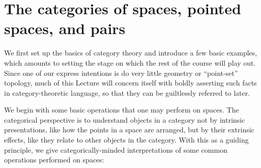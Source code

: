 \section{The categories of spaces, pointed spaces, and pairs}\label{CategoriesSection}

We first set up the basics of category theory and introduce a few basic examples, which amounts to setting the stage on which the rest of the course will play out.
Since one of our express intentions is do very little geometry or ``point-set'' topology, much of this Lecture will concern itself with boldly asserting such facts in category-theoretic language, so that they can be guiltlessly referred to later.

We begin with some basic operations that one may perform on spaces.
The categorical perspective is to understand objects in a category not by intrinsic presentations, like how the points in a space are arranged, but by their extrinsic effects, like they relate to other objects in the category.
With this as a guiding principle, we give categorically-minded interpretations of some common operations performed on spaces:
